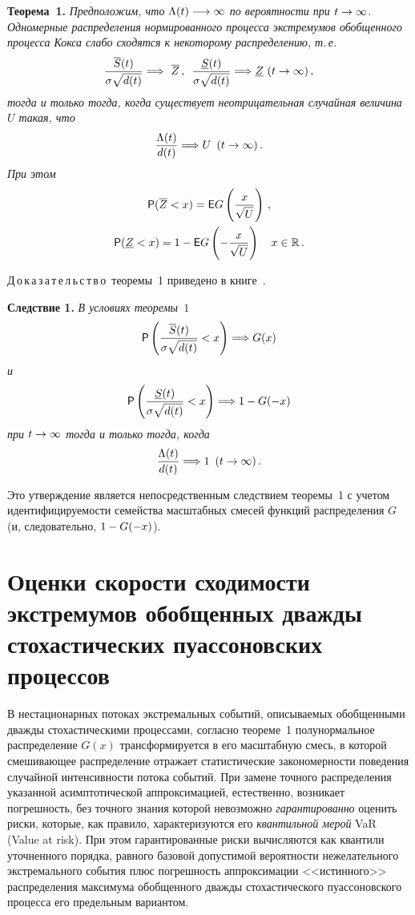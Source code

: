 \begin{multicols}{2}
\noindent
\textbf{Теорема~1.} \textit{Предположим, что $\Lambda
(t)\hm\longrightarrow\infty$ по вероятности при $t\hm\to\infty$.
Одномерные распределения нормированного процесса экстремумов
обобщенного процесса Кокса слабо сходятся к некоторому
распределению, т.\,е.}
$$
\fr{\overline S(t)}{\sigma\sqrt{d(t)}} \Longrightarrow\ 
\overline Z\,,\enskip \fr{\underline S(t)}{\sigma\sqrt{d(t)}}
\Longrightarrow  \underline Z \ (t\to\infty)\,,
$$
\textit{тогда и только тогда, когда существует неотрицательная случайная
величина $U$ такая, что}
\begin{equation}
\displaystyle\frac{\displaystyle \Lambda(t)\mathstrut}{\displaystyle d(t)\mathstrut}\Longrightarrow U\enskip
(t\to\infty)\,.
\label{e2-dul}\end{equation}
\textit{При этом}
\begin{gather*}
{\sf P}(\overline Z<x) = {\sf E}G\left(\fr{x}{\sqrt{U}}\right)\,,\\ 
 {\sf
P}(\underline Z<x) =1-{\sf E}G\left(-\fr{x}{\sqrt{U}}\right)\ \ \ x\in\r\,.
\end{gather*}

\smallskip

\noindent
Д\,о\,к\,а\,з\,а\,т\,е\,л\,ь\,с\,т\,в\,о~теоремы~1 приведено в 
книге~\cite{KorolevSokolov2008}.

\smallskip

\noindent
\textbf{Следствие 1.} \textit{В условиях теоремы~$1$
$$
{\sf P}\left(\displaystyle\frac{\displaystyle \overline S(t)\mathstrut}{\displaystyle \sigma \sqrt{d(t)}\mathstrut} <x\right)
\Longrightarrow G(x)
$$ 
и 
$${\sf P}\left(\displaystyle\frac{\displaystyle \underline
S(t)\mathstrut}{\displaystyle \sigma \sqrt{d(t)}\mathstrut} <x\right) \Longrightarrow 1-G(-x)
$$ при
$t\hm\to\infty$ тогда и только тогда, когда}
$$
\displaystyle\frac{\displaystyle \Lambda(t)\mathstrut}{\displaystyle d(t)\mathstrut} \Longrightarrow   1 \enskip (t\to\infty)\,.
$$

\smallskip

Это утверждение является непосредственным следствием теоремы~1 с
учетом идентифици\-ру\-емости семейства масштабных смесей функций
распределения $G$ (и, следовательно, $1\hm-G(-x)$).

\section{Оценки скорости сходимости экстремумов обобщенных дважды стохастических
пуассоновских процессов}

В нестационарных потоках экстремальных событий, описываемых
обобщенными дважды сто\-хастическими процессами, согласно теореме~1
полунор\-мальное распределение $G(x)$ трансформируется в его
масштабную смесь, в которой сме\-ши\-ва\-ющее распределение отражает
статистические закономерности поведения случайной интенсивности
потока событий. При замене точного распределения указанной
асимптотической аппроксимацией, естественно, возникает погрешность,
без точного знания которой невозможно {\it гарантированно} оценить
риски, которые, как правило, характеризуются его {\it квантильной
мерой} VaR (Value at risk). При этом гарантированные риски
вычисляются как квантили уточненного порядка, равного базовой
допустимой вероятности нежелательного экстремального события плюс
погрешность аппроксимации <<истинного>> распределения максимума
обобщенного дважды стохастического пуассоновского процесса его
предельным вариантом.


\end{multicols}
